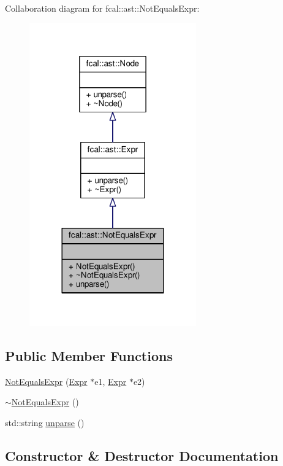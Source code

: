 Collaboration diagram for fcal\+:\+:ast\+:\+:Not\+Equals\+Expr\+:
\nopagebreak
\begin{figure}[H]
\begin{center}
\leavevmode
\includegraphics[width=204pt]{classfcal_1_1ast_1_1NotEqualsExpr__coll__graph}
\end{center}
\end{figure}
\subsection*{Public Member Functions}
\begin{DoxyCompactItemize}
\item 
\hyperlink{classfcal_1_1ast_1_1NotEqualsExpr_ada27557706fc07c8cd434e79e2695e0e}{Not\+Equals\+Expr} (\hyperlink{classfcal_1_1ast_1_1Expr}{Expr} $\ast$e1, \hyperlink{classfcal_1_1ast_1_1Expr}{Expr} $\ast$e2)
\item 
\hyperlink{classfcal_1_1ast_1_1NotEqualsExpr_ac03b2ee9912ac082f97cecc3c30e2311}{$\sim$\+Not\+Equals\+Expr} ()
\item 
std\+::string \hyperlink{classfcal_1_1ast_1_1NotEqualsExpr_a6b00eebe998ad14fa56f52630f0d5bf9}{unparse} ()
\end{DoxyCompactItemize}


\subsection{Constructor \& Destructor Documentation}
